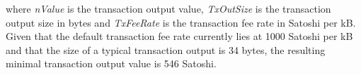 \begin{appendices}
\noindent
where \emph{nValue} is the transaction output value, \emph{TxOutSize} is the transaction output size in bytes and \emph{TxFeeRate} is the transaction fee rate in Satoshi per kB. Given that the default transaction fee rate currently lies at 1000 Satoshi per kB and that the size of a typical transaction output is 34 bytes, the resulting minimal transaction output value is 546 Satoshi.


%
%		
%	
%		
%		
%		
%		
%		
%		
%	

\end{appendices}
